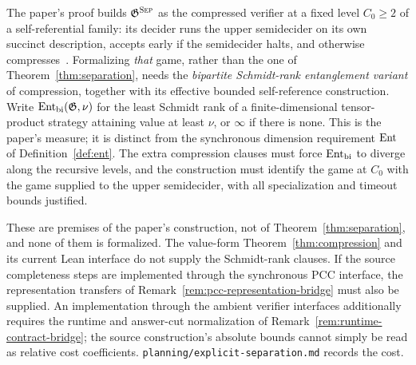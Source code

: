 \begin{remark}
\label{rem:separation-premises}
The paper's proof builds $\mathfrak{G}^{\textsc{Sep}}$ as the compressed verifier at a fixed level
$C_0 \geq 2$ of a self-referential family: its decider runs the upper semidecider on its own
succinct description, accepts early if the semidecider halts, and otherwise
compresses~\cite{AuditSync26}. Formalizing \emph{that} game, rather than the one of
Theorem~\ref{thm:separation}, needs the \emph{bipartite Schmidt-rank entanglement variant} of
compression, together with its effective bounded self-reference construction. Write
$\mathrm{Ent}_{\mathrm{bi}}(\mathfrak{G},\nu)$ for the least Schmidt rank of a finite-dimensional
tensor-product strategy attaining value at least $\nu$, or $\infty$ if there is none. This is
the paper's measure; it is distinct from the synchronous dimension requirement $\mathrm{Ent}$ of
Definition~\ref{def:ent}. The extra compression clauses must force $\mathrm{Ent}_{\mathrm{bi}}$ to
diverge along the recursive levels, and the construction must identify the game at $C_0$ with
the game supplied to the upper semidecider, with all specialization and timeout bounds
justified.

These are premises of the paper's construction, not of Theorem~\ref{thm:separation}, and none
of them is formalized. The value-form Theorem~\ref{thm:compression} and its current Lean
interface do not supply the Schmidt-rank clauses. If the source completeness steps are
implemented through the synchronous PCC interface, the representation transfers of
Remark~\ref{rem:pcc-representation-bridge} must also be supplied. An implementation through
the ambient verifier interfaces additionally requires the runtime and answer-cut normalization
of Remark~\ref{rem:runtime-contract-bridge}; the source construction's absolute bounds cannot
simply be read as relative cost coefficients. \texttt{planning/explicit-separation.md} records
the cost.
\end{remark}

